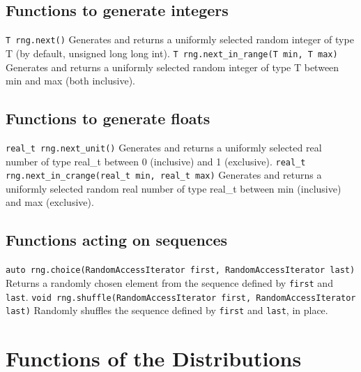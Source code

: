 \documentclass[titlepage, 11pt]{article}
\newcommand{\code}[1]
{\colorbox{light-gray}{\texttt{#1}}}
\begin{document}
\subsection{Functions to generate integers}
\code{T rng.next()}
\newline
\newline
Generates and returns a uniformly selected random integer of type T (by default, unsigned long long int).
\newline
\newline
\code{T rng.next\_in\_range(T min, T max)}
\newline
\newline
Generates and returns a uniformly selected random integer of type T between min and max (both inclusive).


\subsection{Functions to generate floats}
\code{real\_t rng.next\_unit()}
\newline
\newline
Generates and returns a uniformly selected real number of type real\_t between 0 (inclusive) and 1 (exclusive).
\newline
\newline
\code{real\_t rng.next\_in\_crange(real\_t min, real\_t max)}
\newline
\newline
Generates and returns a uniformly selected random real number of type real\_t between min (inclusive) and max (exclusive).


\subsection{Functions acting on sequences}
\code{auto rng.choice(RandomAccessIterator first, RandomAccessIterator last)}
\newline
\newline
Returns a randomly chosen element from the sequence defined by \code{first} and \code{last}.
\newline
\newline
\code{void rng.shuffle(RandomAccessIterator first, RandomAccessIterator last)}
\newline
\newline
Randomly shuffles the sequence defined by \code{first} and \code{last}, in place.


\newpage
\section{Functions of the Distributions} 
\end{document}
